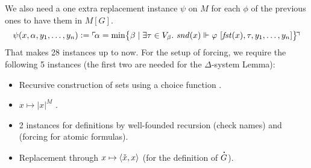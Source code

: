 We also need a one extra replacement instance $\psi$ on $M$ for each
$\phi$ of the
previous ones to have them in $M[G]$.
\[
  \psi(x,\alpha,y_1,\dots,y_n) \mathrel{\mathop:}= \ulcorner{\!\alpha = \min \bigl\{
    \beta \mid \exists\tau\in V_\beta.\  \mathit{snd}(x) \Vdash\varphi\ [\mathit{fst}(x),\tau,y_1,\dots,y_n]\bigr\}\!}\urcorner
\]
That makes 28 instances up to now. For the setup of forcing, we
require the following 5 instances (the first two are  needed for the $\Delta$-system Lemma):

\begin{itemize}
\item Recursive construction of sets using a choice function
  .
\item $x\mapsto |x|^M$
  .
\item 2 instances for definitions by well-founded recursion  (check
  names) and  (forcing for atomic formulas).
\item Replacement through $x\mapsto \langle\check{x},x\rangle$
   (for the
  definition of $\punto{G}$).
\end{itemize}


